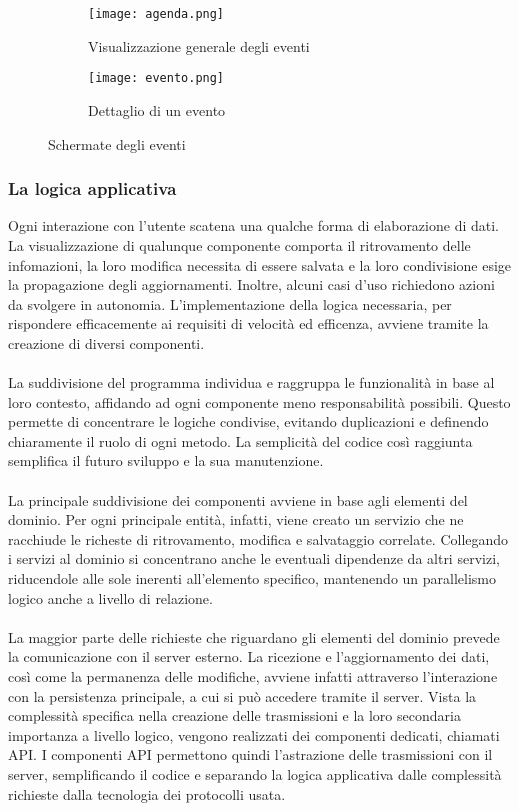 \begin{figure}[htbp]
    \centering
    \begin{subfigure}{0.49\textwidth}
        \centering
        \texttt{[image: agenda.png]}
        \caption{Visualizzazione generale degli eventi}
    \end{subfigure}
    \hfill
    \begin{subfigure}{0.49\textwidth}
        \centering
        \texttt{[image: evento.png]}
        \caption{Dettaglio di un evento}
    \end{subfigure}
    \caption{Schermate degli eventi}
\end{figure}

\clearpage


\subsubsection{La logica applicativa}

Ogni interazione con l'utente scatena una qualche forma di elaborazione di dati. 
La visualizzazione di qualunque componente comporta il ritrovamento delle infomazioni, 
la loro modifica necessita di essere salvata e la loro condivisione esige la propagazione degli aggiornamenti.
Inoltre, alcuni casi d'uso richiedono azioni da svolgere in autonomia.
L'implementazione della logica necessaria, 
per rispondere efficacemente ai requisiti di velocità ed efficenza,
avviene tramite la creazione di diversi componenti.\\
\\
La suddivisione del programma individua e raggruppa le funzionalità in base al loro contesto, 
affidando ad ogni componente meno responsabilità possibili.
Questo permette di concentrare le logiche condivise, 
evitando duplicazioni e definendo chiaramente il ruolo di ogni metodo.
La semplicità del codice così raggiunta semplifica il futuro sviluppo e la sua manutenzione.\\
\\
La principale suddivisione dei componenti avviene in base agli elementi del dominio.
Per ogni principale entità, infatti, viene creato un servizio che ne racchiude
le richeste di ritrovamento, modifica e salvataggio correlate.
Collegando i servizi al dominio si concentrano anche le eventuali dipendenze da altri servizi, 
riducendole alle sole inerenti all'elemento specifico, 
mantenendo un parallelismo logico anche a livello di relazione.\\
\\
La maggior parte delle richieste che riguardano gli elementi del dominio prevede 
la comunicazione con il server esterno. 
La ricezione e l'aggiornamento dei dati, così come la permanenza delle modifiche, avviene infatti attraverso 
l'interazione con la persistenza principale, a cui si può accedere tramite il server.
Vista la complessità specifica nella creazione delle trasmissioni e 
la loro secondaria importanza a livello logico, 
vengono realizzati dei componenti dedicati, chiamati API.
I componenti API permettono quindi l'astrazione delle trasmissioni con il server, 
semplificando il codice e 
separando la logica applicativa dalle complessità richieste dalla tecnologia dei protocolli usata.

